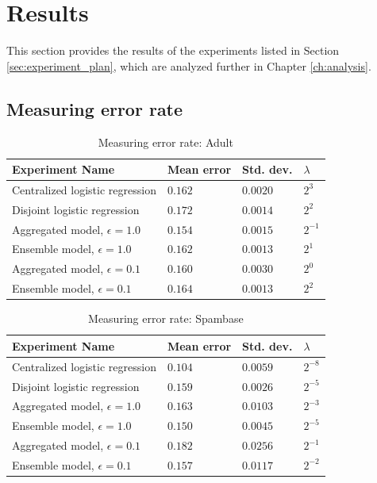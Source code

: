 
\section{Results}
\label{sec:experiment_results}

	This section provides the results of the experiments listed in Section \ref{sec:experiment_plan}, which are analyzed further in Chapter \ref{ch:analysis}.

\subsection{Measuring error rate}

\begin{table}[H]
			\centering
	\begin{tabular}{|l|l|l|l|}

		{\bf Experiment Name}            & {\bf Mean error} & {\bf Std. dev.} & $\lambda$ \\
		\hline
		Centralized logistic regression  & $0.162$          & $0.0020$        & $2^3$     \\
		Disjoint logistic regression     & $0.172$          & $0.0014$        & $2^2$     \\
		Aggregated model, $\epsilon=1.0$ & $0.154$          & $0.0015$        & $2^{-1}$  \\
		Ensemble model, $\epsilon=1.0$   & $0.162$          & $0.0013$        & $2^1$     \\
		Aggregated model, $\epsilon=0.1$ & $0.160$          & $0.0030$        & $2^0$     \\
		Ensemble model, $\epsilon=0.1$   & $0.164$          & $0.0013$        & $2^2$    
	\end{tabular}
	\caption{Measuring error rate: Adult}
	\label{tab:results_measuring_accuracy}
\end{table}

\begin{table}[H]
	\centering
	\begin{tabular}{|l|l|l|l|}
		{\bf Experiment Name}            & {\bf Mean error} & {\bf Std. dev.} & {\bf $\lambda$} \\
		\hline
		Centralized logistic regression  & $0.104$          & $0.0059$        & $2^{-8}$        \\
		Disjoint logistic regression     & $0.159$          & $0.0026$        & $2^{-5}$        \\
		Aggregated model, $\epsilon=1.0$ & $0.163$          & $0.0103$        & $2^{-3}$        \\
		Ensemble model, $\epsilon=1.0$   & $0.150$          & $0.0045$        & $2^{-5}$        \\
		Aggregated model, $\epsilon=0.1$ & $0.182$          & $0.0256$        & $2^{-1}$        \\
		Ensemble model, $\epsilon=0.1$   & $0.157$          & $0.0117$        & $2^{-2}$       
	\end{tabular}
	\caption{Measuring error rate: Spambase}
	\label{tab:results_measuring_accuracy_spam}
\end{table}

